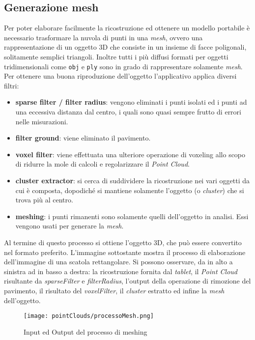 \subsection{Generazione mesh}
Per poter elaborare facilmente la ricostruzione ed ottenere un modello portabile è necessario trasformare la nuvola di punti in una \emph{mesh}, ovvero una rappresentazione di un oggetto 3D che consiste in un insieme di facce poligonali, solitamente semplici triangoli. Inoltre tutti i più diffusi formati per oggetti tridimensionali come \texttt{obj} e \texttt{ply} sono in grado di rappresentare solamente \emph{mesh}.\\
Per ottenere una buona riproduzione dell'oggetto l'applicativo applica diversi filtri:
\begin{itemize}
	\item \textbf{sparse filter / filter radius}: vengono eliminati i punti isolati ed i punti ad una eccessiva distanza dal centro, i quali sono quasi sempre frutto di errori nelle misurazioni.
	\item \textbf{filter ground}: viene eliminato il pavimento.
	\item \textbf{voxel filter}: viene effettuata una ulteriore operazione di voxeling allo scopo di ridurre la mole di calcoli e regolarizzare il \emph{Point Cloud}.
	\item \textbf{cluster extractor}: si cerca di suddividere la ricostruzione nei vari oggetti da cui è composta, dopodiché si mantiene solamente l'oggetto (o \emph{cluster}) che si trova più al centro.
	\item \textbf{meshing}: i punti rimanenti sono solamente quelli dell'oggetto in analisi. Essi vengono usati per generare la \emph{mesh}.
\end{itemize}
Al termine di questo processo si ottiene l'oggetto 3D, che può essere convertito nel formato preferito. L'immagine sottostante mostra il processo di elaborazione dell'immagine di una scatola rettangolare. Si possono osservare, da in alto a sinistra ad in basso a destra: la ricostruzione fornita dal \emph{tablet}, il \emph{Point Cloud} risultante da \emph{sparseFilter} e \emph{filterRadius}, l'output della operazione di rimozione del pavimento, il risultato del \emph{voxelFilter}, il \emph{cluster} estratto ed infine la \emph{mesh} dell'oggetto.
\begin{figure}[!h] 
    \centering 
    \texttt{[image: pointClouds/processoMesh.png]} 
    \caption{Input ed Output del processo di meshing}
\end{figure}

